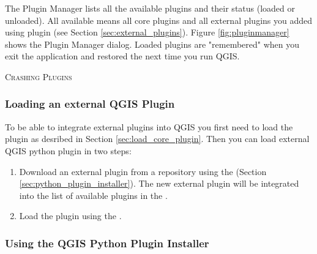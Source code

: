 The Plugin Manager lists all the available plugins and their status (loaded or unloaded).
All available means all core plugins and all external plugins you added using  plugin (see Section \ref{sec:external_plugins}). 
Figure \ref{fig:pluginmanager} shows the Plugin Manager dialog.
Loaded plugins are "remembered" when you exit the application and restored the next time you run QGIS.

\begin{Tip}\caption{\textsc{Crashing Plugins}}
\end{Tip} 

\subsubsection{Loading an external QGIS Plugin}\label{sec:load_external_plugin} 

To be able to integrate external plugins into QGIS you first need to load the  plugin as desribed in Section \ref{sec:load_core_plugin}.
Then you can load external QGIS python plugin in two steps: 

\begin{enumerate}
\item Download an external plugin from a repository using the  (Section \ref{sec:python_plugin_installer}).
The new external plugin will be integrated into the list of available plugins in the .
\item Load the plugin using the .
\end{enumerate}

\subsubsection{Using the QGIS Python Plugin Installer}\label{sec:python_plugin_installer}

